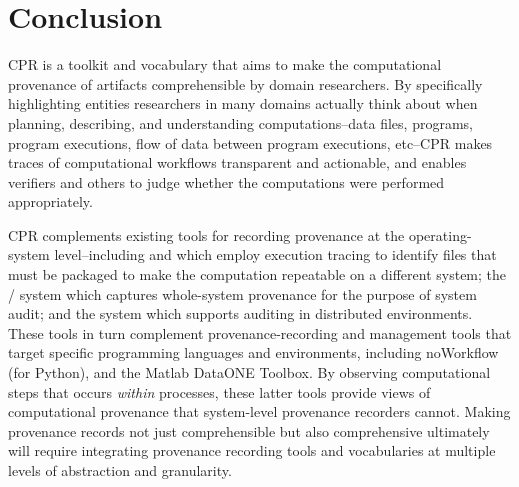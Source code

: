 \section{Conclusion}

CPR is a toolkit and vocabulary that aims to make the computational provenance of artifacts comprehensible by domain researchers. By specifically highlighting entities researchers in many domains actually think about when planning, describing, and understanding computations--data files, programs, program executions, flow of data between program executions, etc--CPR makes traces of computational workflows transparent and actionable, and enables verifiers and others to judge whether the computations were performed appropriately.

CPR complements existing tools for recording provenance at the operating-system level--including  and  which employ execution tracing to identify files that must be packaged to make the computation repeatable on a different system; the / system which captures whole-system provenance for the purpose of system audit; and the  system which supports auditing in distributed environments. These tools in turn complement provenance-recording and management tools that target specific programming languages and environments, including noWorkflow (for Python), and the Matlab DataONE Toolbox. By observing computational steps that occurs \emph{within} processes, these latter tools provide views of computational provenance that system-level provenance recorders cannot.  Making provenance records not just comprehensible but also comprehensive ultimately will require integrating provenance recording tools and vocabularies at multiple levels of abstraction and granularity.